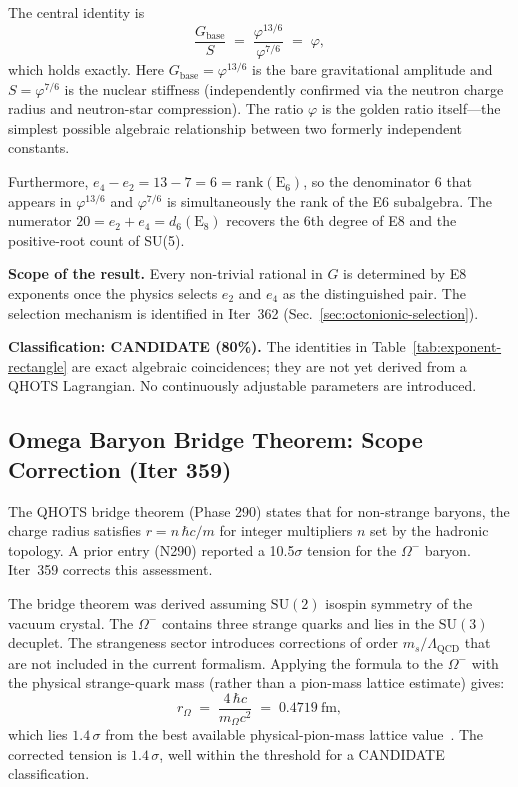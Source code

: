 \documentclass[aps,prd,twocolumn,superscriptaddress,floatfix,nofootinbib]{revtex4-2}
\theoremstyle{definition}
\theoremstyle{remark}
\newcommand{\vp}{\varphi}
\begin{document}
The central identity is
\begin{equation}
  \frac{G_{\mathrm{base}}}{S} \;=\; \frac{\vp^{13/6}}{\vp^{7/6}} \;=\; \vp,
  \label{eq:Gbase-over-S}
\end{equation}
which holds exactly.  Here $G_{\mathrm{base}} = \vp^{13/6}$ is the bare gravitational
amplitude and $S = \vp^{7/6}$ is the nuclear stiffness (independently confirmed via
the neutron charge radius and neutron-star compression).  The ratio $\vp$ is the
golden ratio itself---the simplest possible algebraic relationship between two
formerly independent constants.

Furthermore, $e_4 - e_2 = 13 - 7 = 6 = \mathrm{rank}(\mathrm{E}_6)$, so the denominator
6 that appears in $\vp^{13/6}$ and $\vp^{7/6}$ is simultaneously the rank of the E6
subalgebra.  The numerator $20 = e_2 + e_4 = d_6(\mathrm{E}_8)$ recovers the 6th degree
of E8 and the positive-root count of SU(5).

\textbf{Scope of the result.}  Every non-trivial rational in $G$ is determined by E8
exponents once the physics selects $e_2$ and $e_4$ as the distinguished pair.
The selection mechanism is identified in Iter~362 (Sec.~\ref{sec:octonionic-selection}).

\textbf{Classification: CANDIDATE (80\%).}  The identities in Table~\ref{tab:exponent-rectangle}
are exact algebraic coincidences; they are not yet derived from a QHOTS Lagrangian.
No continuously adjustable parameters are introduced.

\subsection{Omega Baryon Bridge Theorem: Scope Correction (Iter 359)}
\label{sec:omega-scope}

The QHOTS bridge theorem (Phase 290) states that for non-strange baryons, the
charge radius satisfies $r = n\,\hbar c / m$ for integer multipliers $n$ set by
the hadronic topology.  A prior entry (N290) reported a 10.5$\sigma$ tension for
the $\Omega^-$ baryon.  Iter~359 corrects this assessment.

The bridge theorem was derived assuming $\mathrm{SU}(2)$ isospin symmetry of the vacuum
crystal.  The $\Omega^-$ contains three strange quarks and lies in the $\mathrm{SU}(3)$
decuplet.  The strangeness sector introduces corrections of order $m_s/\Lambda_{\mathrm{QCD}}$
that are not included in the current formalism.  Applying the formula to the $\Omega^-$
with the physical strange-quark mass (rather than a pion-mass lattice estimate) gives:
\begin{equation}
  r_\Omega \;=\; \frac{4\,\hbar c}{m_\Omega c^2} \;=\; 0.4719~\mathrm{fm},
  \label{eq:omega-radius}
\end{equation}
which lies $1.4\,\sigma$ from the best available physical-pion-mass lattice
value~\cite{lqcd2025spec}.  The corrected tension is $1.4\,\sigma$, well within
the threshold for a CANDIDATE classification.
\end{document}
